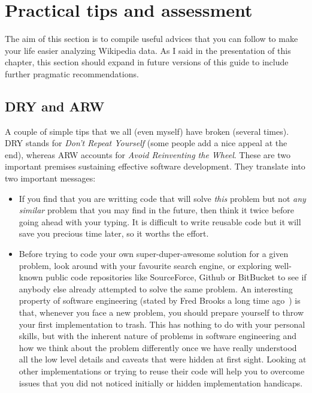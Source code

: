 \section{Practical tips and assessment}
The aim of this section is to compile useful advices that you can follow
to make your life easier analyzing Wikipedia data. As I said in the presentation
of this chapter, this section should expand in future versions of this guide
to include further pragmatic recommendations.

\subsection{DRY and ARW}
A couple of simple tips that we all (even myself) have broken (several times).
DRY stands for \textit{Don't Repeat Yourself} (some people add a nice appeal at
the end), whereas ARW accounts for \textit{Avoid Reinventing the Wheel}. These
are two important premises sustaining effective software development. They
translate into two important messages:

\begin{itemize}
 \item If you find that you are writting code that will solve \textit{this} problem
but not \textit{any similar} problem that you may find in the future, then think it
twice before going ahead with your typing. It is difficult to write reusable code
but it will save you precious time later, so it worths the effort.

\item Before trying to code your own super-duper-awesome solution for a given
problem, look around with your favourite search engine, or exploring well-known
public code repositories like SourceForce, Github or BitBucket to
see if anybody else already attempted to solve the same problem. An interesting
property of software engineering (stated by Fred Brooks a long time ago~\cite{Brooks:1995})
is that, whenever you face a new problem, you should prepare yourself to throw
your first implementation to trash. This has nothing to do with your personal
skills, but with the inherent nature of problems in software engineering and how
we think about the problem differently once we have really understood all the low
level details and caveats that were hidden at first sight. Looking at other implementations
or trying to reuse their code will help you to overcome issues that you did not
noticed initially or hidden implementation handicaps.
\end{itemize}


